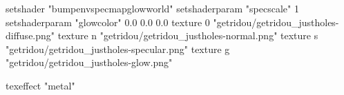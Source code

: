 setshader "bumpenvspecmapglowworld"
setshaderparam "specscale" 1
setshaderparam "glowcolor" 0.0 0.0 0.0
texture 0 "getridou/getridou_justholes-diffuse.png"
texture n "getridou/getridou_justholes-normal.png"
texture s "getridou/getridou_justholes-specular.png"
texture g "getridou/getridou_justholes-glow.png"

texeffect "metal"

